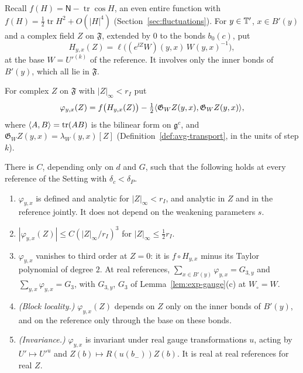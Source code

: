 Recall $f(H)=\mathsf N-\operatorname{tr}\cos H$, an even entire function with $f(H)=\frac12\operatorname{tr}H^2+O(|H|^4)$ (Section~\ref{sec:fluctuations}). For $y\in\mathbb T'$, $x\in B'(y)$ and a complex field $Z$ on $\mathfrak F$, extended by $0$ to the bonds $b_0(c)$, put
\[
H_{y,x}(Z)=\ell\big((e^{\ii Z}W)(y,x)\,W(y,x)^{-1}\big),
\]
at the base $W=U'^{(k)}$ of the reference. It involves only the inner bonds of $B'(y)$, which all lie in $\mathfrak F$.

\begin{definition}\label{def:gf-pieces}
For complex $Z$ on $\mathfrak F$ with $|Z|_\infty<r_I$ put
\[
\varphi_{y,x}(Z)=f\big(H_{y,x}(Z)\big)-\tfrac12\langle \mathfrak G_WZ(y,x),\mathfrak G_WZ(y,x)\rangle,
\]
where $\langle A,B\rangle=\operatorname{tr}(AB)$ is the bilinear form on $\mathfrak g^c$, and $\mathfrak G_WZ(y,x)=\lambda_W(y,x)[Z]$ (Definition~\ref{def:avg-transport}, in the units of step $k$).
\end{definition}

\begin{proposition}\label{prop:gf-pieces}
There is $C$, depending only on $d$ and $G$, such that the following holds at every reference of the Setting with $\delta_c<\delta_P$.
\begin{enumerate}[label=(\alph*)]
\item $\varphi_{y,x}$ is defined and analytic for $|Z|_\infty<r_I$, and analytic in $Z$ and in the reference jointly. It does not depend on the weakening parameters $s$.
\item $|\varphi_{y,x}(Z)|\le C(|Z|_\infty/r_I)^3$ for $|Z|_\infty\le\frac12r_I$.
\item $\varphi_{y,x}$ vanishes to third order at $Z=0$: it is $f\circ H_{y,x}$ minus its Taylor polynomial of degree $2$. At real references, $\sum_{x\in B'(y)}\varphi_{y,x}=G_{3,y}$ and $\sum_{y,x}\varphi_{y,x}=G_3$, with $G_{3,y}$, $G_3$ of Lemma~\ref{lem:exp-gauge}(c) at $W_\circ=W$.
\item \emph{(Block locality.)} $\varphi_{y,x}(Z)$ depends on $Z$ only on the inner bonds of $B'(y)$, and on the reference only through the base on these bonds.
\item \emph{(Invariance.)} $\varphi_{y,x}$ is invariant under real gauge transformations $u$, acting by $U'\mapsto U'^u$ and $Z(b)\mapsto R(u(b_-))Z(b)$. It is real at real references for real $Z$.
\end{enumerate}
\end{proposition}

